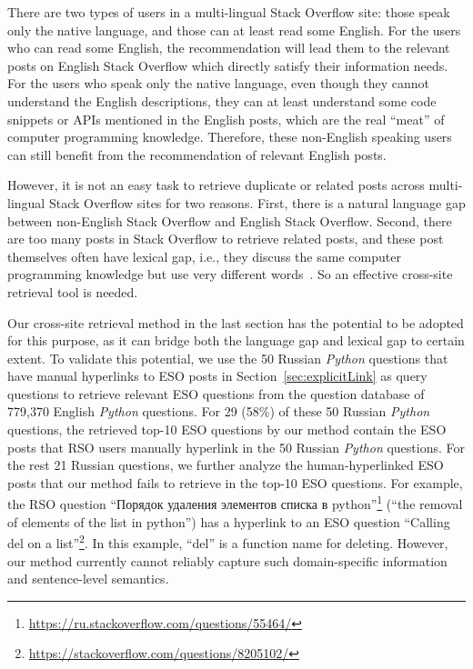 There are two types of users in a multi-lingual Stack Overflow site: those speak only the native language, and those can at least read some English.
For the users who can read some English, the recommendation will lead them to the relevant posts on English Stack Overflow which directly satisfy their information needs.
For the users who speak only the native language, even though they cannot understand the English descriptions, they can at least understand some code snippets or APIs mentioned in the English posts, which are the real ``meat'' of computer programming knowledge.
Therefore, these non-English speaking users can still benefit from the recommendation of relevant English posts.

However, it is not an easy task to retrieve duplicate or related posts across multi-lingual Stack Overflow sites for two reasons.
First, there is a natural language gap between non-English Stack Overflow and English Stack Overflow.
Second, there are too many posts in Stack Overflow to retrieve related posts, and these post themselves often have lexical gap, i.e., they discuss the same computer programming knowledge but use very different words~\cite{chen2016learning}.
So an effective cross-site retrieval tool is needed.

Our cross-site retrieval method in the last section has the potential to be adopted for this purpose, as it can bridge both the language gap and lexical gap to certain extent.
To validate this potential, we use the 50 Russian \textit{Python} questions that have manual hyperlinks to ESO posts in Section~\ref{sec:explicitLink} as query questions to retrieve relevant ESO questions from the question database of 779,370 English \textit{Python} questions.
For 29 (58\%) of these 50 Russian \textit{Python} questions, the retrieved top-10 ESO questions by our method contain the ESO posts that RSO users manually hyperlink in the 50 Russian \textit{Python} questions.
For the rest 21 Russian questions, we further analyze the human-hyperlinked ESO posts that our method fails to retrieve in the top-10 ESO questions.
For example, the RSO question ``\foreignlanguage{russian}{Порядок удаления элементов списка в python}''\footnote{\url{https://ru.stackoverflow.com/questions/55464/}} (``the removal of elements of the list in python'') has a hyperlink to an ESO question ``Calling del on a list''\footnote{\url{https://stackoverflow.com/questions/8205102/}}.
In this example, ``del'' is a function name for deleting.
However, our method currently cannot reliably capture such domain-specific information and sentence-level semantics.

